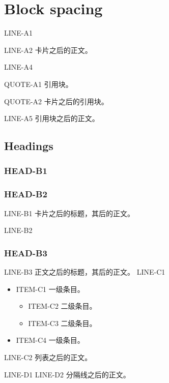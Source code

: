 \section{Block spacing}
LINE-A1

LINE-A2 卡片之后的正文。

LINE-A4
\begin{quoteblock}
QUOTE-A1 引用块。
\end{quoteblock}
\begin{quoteblock}
QUOTE-A2 卡片之后的引用块。
\end{quoteblock}
LINE-A5 引用块之后的正文。
\newpage
\subsection{Headings}
\subsubsection{HEAD-B1}
\subsubsection{HEAD-B2}
LINE-B1 卡片之后的标题，其后的正文。

LINE-B2
\subsubsection{HEAD-B3}
LINE-B3 正文之后的标题，其后的正文。
\newpage
LINE-C1
\begin{itemize}
  \item ITEM-C1 一级条目。
  \begin{itemize}
    \item ITEM-C2 二级条目。
    \item ITEM-C3 二级条目。
  \end{itemize}
  \item ITEM-C4 一级条目。
\end{itemize}
LINE-C2 列表之后的正文。

LINE-D1
\Separator{}
LINE-D2 分隔线之后的正文。

